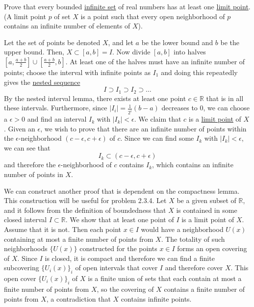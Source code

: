   \begin{exercise}
    Prove that every bounded \hyperref[st-def:infinite-set]{infinite set} of real numbers has at least one \hyperref[pst-def:limit-point]{limit point}. (A limit point $p$ of set $X$ is a point such that every open neighborhood of $p$ contains an infinite number of elements of $X$). 
  \end{exercise}
  \begin{solution}
    Let the set of points be denoted $X$, and let $a$ be the lower bound and $b$ be the upper bound. Then, $X \subset [a, b] = I$. Now divide $[a, b]$ into halves $[a, \frac{a + b}{2}] \cup [\frac{a + b}{2}, b]$. At least one of the halves must have an infinite number of points; choose the interval with infinite points as $I_1$ and doing this repeatedly gives the \hyperref[pst-thm:nested-sequence-theorem]{nested sequence} 
    \begin{equation}
      I \supset I_1 \supset I_2 \supset \ldots
    \end{equation}
    By the nested interval lemma, there exists at least one point $c \in \mathbb{R}$ that is in all these intervals. Furthermore, since $|I_i| = \frac{1}{2^i} (b - a)$ decreases to $0$, we can choose a $\epsilon > 0$ and find an interval $I_k$ with $|I_k| < \epsilon$. We claim that $c$ is a \hyperref[pst-def:limit-point]{limit point} of $X$. Given an $\epsilon$, we wish to prove that there are an infinite number of points within the $\epsilon$-neighborhood $(c - \epsilon, c + \epsilon)$ of $c$. Since we can find some $I_k$ with $|I_k| < \epsilon$, we can see that 
    \begin{equation}
      I_k \subset (c - \epsilon, c + \epsilon)
    \end{equation}
    and therefore the $\epsilon$-neighborhood of $c$ contains $I_k$, which contains an infinite number of points in $X$. 

    We can construct another proof that is dependent on the compactness lemma. This construction will be useful for problem 2.3.4. Let $X$ be a given subset of $\mathbb{R}$, and it follows from the definition of boundedness that $X$ is contained in some closed interval $I \subset \mathbb{R}$. We show that at least one point of $I$ is a limit point of $X$. Assume that it is not. Then each point $x \in I$ would have a neighborhood $U(x)$ containing at most a finite number of points from $X$. The totality of such neighborhoods $\{U(x)\}$ constructed for the points $x \in I$ forms an open covering of $X$. Since $I$ is closed, it is compact and therefore we can find a finite subcovering $\{U_i(x)\}_{i}$ of open intervals that cover $I$ and therefore cover $X$. This open cover $\{U_i(x)\}_{i}$ of $X$ is a finite union of sets that each contain at most a finite number of points from $X$, so the covering of $X$ contains a finite number of points from $X$, a contradiction that $X$ contains infinite points. 
  \end{solution}

